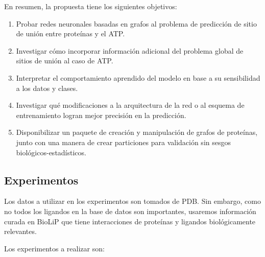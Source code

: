 \documentclass[
    left=2.0cm,         %
    right=2.0cm,        %
    top=2.0cm,          %
    bottom=2.5cm,         %
    bindingoffset=6mm,  %
    nohyphenation=false %
]{eiti/eiti-thesis}
\begin{document}
En resumen, la propuesta tiene los siguientes objetivos:

\begin{enumerate}
    \item Probar redes neuronales basadas en grafos al problema de predicción 
    de sitio de unión entre proteínas y el ATP.
    \item Investigar cómo incorporar información adicional del
    problema global de sitios de unión al caso de ATP.
    \item Interpretar el comportamiento aprendido del modelo en base a su sensibilidad
    a los datos y clases.
    \item Investigar qué modificaciones a la arquitectura de la red o al
    esquema de entrenamiento logran mejor precisión en la predicción.
    \item Disponibilizar un paquete de creación y manipulación de grafos de proteínas,
    junto con una manera de crear particiones para validación sin sesgos
    biológicos-estadísticos.
\end{enumerate}


\subsection{Experimentos}\label{experimentos}

Los datos a utilizar en los experimentos son tomados de PDB. Sin embargo, como no
todos los ligandos en la base de datos son importantes, usaremos
información curada en BioLiP\cite{yang2012biolip} que tiene interacciones de proteínas y ligandos
biológicamente relevantes.

Los experimentos a realizar son:
\end{document}
